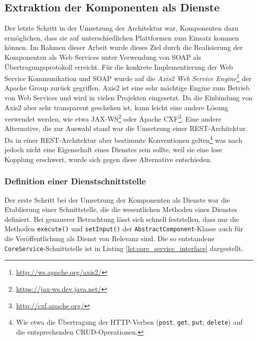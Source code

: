 \subsection{Extraktion der Komponenten als Dienste} %
\label{sub:extraktion_der_komponenten_als_dienste}

  Der letzte Schritt in der Umsetzung der Architektur war, Komponenten dazu ermöglichen, dass sie auf unterschiedlichen Plattformen zum Einsatz kommen können. Im Rahmen dieser Arbeit wurde dieses Ziel durch die Realisierung der Komponenten als Web Services unter Verwendung von SOAP als Übertragungsprotokoll erreicht. Für die konkrete Implementierung der Web Service Kommunikation und SOAP wurde auf die \emph{Axis2 Web Service Engine}\footnote{\url{http://ws.apache.org/axis2/}} der Apache Group zurück gegriffen. Axis2 ist eine sehr mächtige Engine zum Betrieb von Web Services und wird in vielen Projekten eingesetzt. Da die Einbindung von Axis2 aber sehr transparent geschehen ist, kann leicht eine andere Lösung verwendet werden, wie etwa JAX-WS\footnote{\url{https://jax-ws.dev.java.net/}} oder Apache CXF\footnote{\url{http://cxf.apache.org/}}. Eine andere Alternative, die zur Auswahl stand war die Umsetzung einer REST-Architektur. Da in einer REST-Architektur aber bestimmte Konventionen gelten\footnote{Wie etwa die Übertragung der HTTP-Verben (\lstinline[basicstyle=\ttfamily\footnotesize]{post}, \lstinline[basicstyle=\ttfamily\footnotesize]{get}, \lstinline[basicstyle=\ttfamily\footnotesize]{put}, \lstinline[basicstyle=\ttfamily\footnotesize]{delete}) auf die entsprechenden CRUD-Operationen.} was nach~\citep{service_oriented_computing} jedoch nicht eine Eigenschaft eines Dienstes sein sollte, weil sie eine lose Kopplung erschwert, wurde sich gegen diese Alternative entschieden.
  
\subsubsection{Definition einer Dienstschnittstelle} %
\label{ssub:definition_einer_dienstschnittstelle}

  Der erste Schritt bei der Umsetzung der Komponenten als Dienste war die Etablierung einer Schnittstelle, die die wesentlichen Methoden eines Dienstes definiert. Bei genauerer Betrachtung lässt sich schnell feststellen, dass nur die Methoden \verb!execute()! und \verb!setInput()! der \verb!AbstractComponent!-Klasse auch für die Veröffentlichung als Dienst von Relevanz sind. Die so entstandene \verb!CoreService!-Schnittstelle ist in Listing \ref{lst:core_service_interface} dargestellt.

